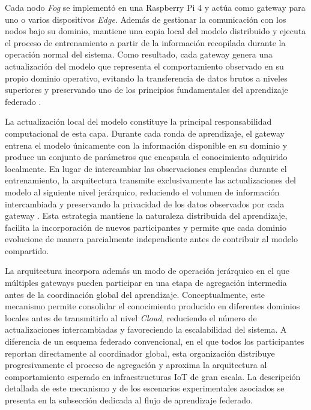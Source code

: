 \documentclass[journal,article,submit,moreauthors]{Definitions/mdpi}
\begin{document}
Cada nodo \textit{Fog} se implementó en una Raspberry Pi 4 y actúa como gateway para uno o varios dispositivos \textit{Edge}. Además de gestionar la comunicación con los nodos bajo su dominio, mantiene una copia local del modelo distribuido y ejecuta el proceso de entrenamiento a partir de la información recopilada durante la operación normal del sistema. Como resultado, cada gateway genera una actualización del modelo que representa el comportamiento observado en su propio dominio operativo, evitando la transferencia de datos brutos a niveles superiores y preservando uno de los principios fundamentales del aprendizaje federado \cite{McMahan2017,Imteaj2022,Ramadan2025}.

La actualización local del modelo constituye la principal responsabilidad computacional de esta capa. Durante cada ronda de aprendizaje, el gateway entrena el modelo únicamente con la información disponible en su dominio y produce un conjunto de parámetros que encapsula el conocimiento adquirido localmente. En lugar de intercambiar las observaciones empleadas durante el entrenamiento, la arquitectura transmite exclusivamente las actualizaciones del modelo al siguiente nivel jerárquico, reduciendo el volumen de información intercambiada y preservando la privacidad de los datos observados por cada gateway \cite{Hajj2023,Chaurasia2024,Ficco2024}. Esta estrategia mantiene la naturaleza distribuida del aprendizaje, facilita la incorporación de nuevos participantes y permite que cada dominio evolucione de manera parcialmente independiente antes de contribuir al modelo compartido.
%

La arquitectura incorpora además un modo de operación jerárquico en el que múltiples gateways pueden participar en una etapa de agregación intermedia antes de la coordinación global del aprendizaje. Conceptualmente, este mecanismo permite consolidar el conocimiento producido en diferentes dominios locales antes de transmitirlo al nivel \textit{Cloud}, reduciendo el número de actualizaciones intercambiadas y favoreciendo la escalabilidad del sistema. A diferencia de un esquema federado convencional, en el que todos los participantes reportan directamente al coordinador global, esta organización distribuye progresivamente el proceso de agregación y aproxima la arquitectura al comportamiento esperado en infraestructuras IoT de gran escala. La descripción detallada de este mecanismo y de los escenarios experimentales asociados se presenta en la subsección dedicada al flujo de aprendizaje federado.
%
\end{document}
